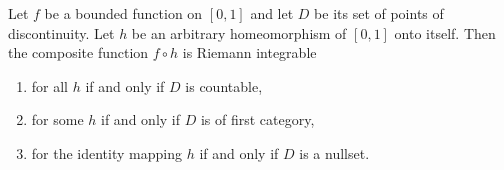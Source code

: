 Let $f$ be a bounded function on $[0,1]$ and let $D$ be its set of points of discontinuity. Let $h$ be an arbitrary homeomorphism of $[0,1]$ onto itself. Then the composite function $f \circ h$ is Riemann integrable

\begin{enumerate}
\item[(a)] for all $h$ if and only if $D$ is countable,
\item[(b)] for some $h$ if and only if $D$ is of first category,
\item[(c)] for the identity mapping $h$ if and only if $D$ is a nullset.
\end{enumerate}
